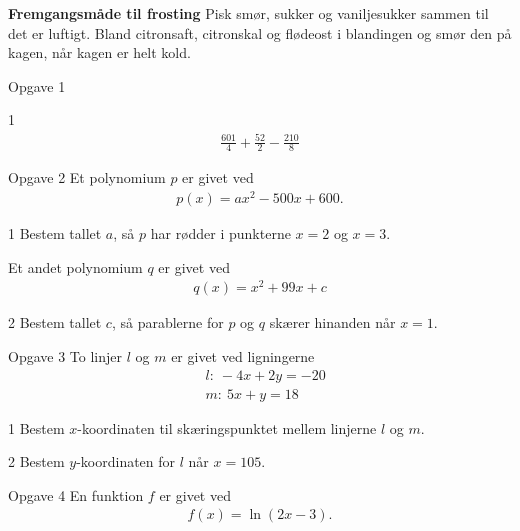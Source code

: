 \textbf{Fremgangsmåde til frosting}
Pisk smør, sukker og vaniljesukker sammen til det er luftigt. Bland citronsaft, citronskal og flødeost i blandingen og smør den på kagen, når kagen er helt kold. 

\newpage

\begin{opgavetekst}{Opgave 1}
\end{opgavetekst}	
\begin{delopgave}{1}
	\begin{align*}
		\frac{601}{4} + \frac{52}{2} - \frac{210}{8}
	\end{align*}
\end{delopgave}
%
%
\begin{opgavetekst}{Opgave 2}
	Et polynomium $p$ er givet ved
	\begin{align*}
		p(x) = ax^2 - 500x + 600.
	\end{align*}
\end{opgavetekst}
\begin{delopgave}{1}
	Bestem tallet $a$, så $p$ har rødder i punkterne $x = 2$ og $x = 3$.  
\end{delopgave}
\begin{meretekst}
	Et andet polynomium $q$ er givet ved
	\begin{align*}
		q(x) = x^2 + 99x + c
	\end{align*}
\end{meretekst}
\begin{delopgave}{2}
	Bestem tallet $c$, så parablerne for $p$ og $q$ skærer hinanden når $x = 1$. 
\end{delopgave}
%
%
\begin{opgavetekst}{Opgave 3}
	To linjer $l$ og $m$ er givet ved ligningerne
	\begin{align*}
		&l: \ -4x + 2y = -20 \\
		&m: \ 5x + y = 18
	\end{align*}
\end{opgavetekst}
\begin{delopgave}{1}
	Bestem $x$-koordinaten til skæringspunktet mellem linjerne $l$ og $m$. 
\end{delopgave}
\begin{delopgave}{2}
	Bestem $y$-koordinaten for $l$ når $x = 105$. 
\end{delopgave}
%
%
\begin{opgavetekst}{Opgave 4}
	En funktion $f$ er givet ved
	\begin{align*}
		f(x) = \ln(2x-3).
	\end{align*}
\end{opgavetekst}
